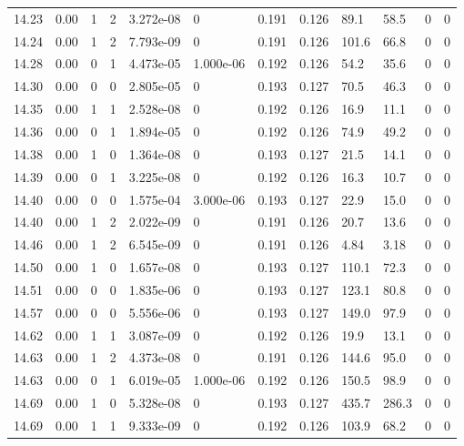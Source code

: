 \documentclass[preview]{standalone}
\begin{document}
{{{{{{{{{{{\begin{tabular}{L{1.2cm}C{1.2cm} C{0.3cm}C{0.5cm} C{1.4cm}C{1.4cm} C{1.4cm}C{1.4cm} C{1.6cm}C{1.6cm} C{1.6cm}C{1.6cm}}
  14.23  &  0.00  & 1     &  2 &  3.272e-08  & 0  &  0.191&   0.126& 89.1 & 58.5   &  0 & 0  \\ 
  14.24  &  0.00  & 1     &  2 &  7.793e-09  & 0  &  0.191&   0.126& 101.6 & 66.8   &  0 & 0  \\ 
  14.28  &  0.00  & 0     &  1 &  4.473e-05  & 1.000e-06  &  0.192&   0.126& 54.2 & 35.6   &  0 & 0  \\ 
  14.30  &  0.00  & 0     &  0 &  2.805e-05  & 0  &  0.193&   0.127& 70.5 & 46.3   &  0 & 0  \\ 
  14.35  &  0.00  & 1     &  1 &  2.528e-08  & 0  &  0.192&   0.126& 16.9 & 11.1   &  0 & 0  \\ 
  14.36  &  0.00  & 0     &  1 &  1.894e-05  & 0  &  0.192&   0.126& 74.9 & 49.2   &  0 & 0  \\ 
  14.38  &  0.00  & 1     &  0 &  1.364e-08  & 0  &  0.193&   0.127& 21.5 & 14.1   &  0 & 0  \\ 
  14.39  &  0.00  & 0     &  1 &  3.225e-08  & 0  &  0.192&   0.126& 16.3 & 10.7   &  0 & 0  \\ 
  14.40  &  0.00  & 0     &  0 &  1.575e-04  & 3.000e-06  &  0.193&   0.127& 22.9 & 15.0   &  0 & 0  \\ 
  14.40  &  0.00  & 1     &  2 &  2.022e-09  & 0  &  0.191&   0.126& 20.7 & 13.6   &  0 & 0  \\ 
  14.46  &  0.00  & 1     &  2 &  6.545e-09  & 0  &  0.191&   0.126& 4.84 & 3.18   &  0 & 0  \\ 
  14.50  &  0.00  & 1     &  0 &  1.657e-08  & 0  &  0.193&   0.127& 110.1 & 72.3   &  0 & 0  \\ 
  14.51  &  0.00  & 0     &  0 &  1.835e-06  & 0  &  0.193&   0.127& 123.1 & 80.8   &  0 & 0  \\ 
  14.57  &  0.00  & 0     &  0 &  5.556e-06  & 0  &  0.193&   0.127& 149.0 & 97.9   &  0 & 0  \\ 
  14.62  &  0.00  & 1     &  1 &  3.087e-09  & 0  &  0.192&   0.126& 19.9 & 13.1   &  0 & 0  \\ 
  14.63  &  0.00  & 1     &  2 &  4.373e-08  & 0  &  0.191&   0.126& 144.6 & 95.0   &  0 & 0  \\ 
  14.63  &  0.00  & 0     &  1 &  6.019e-05  & 1.000e-06  &  0.192&   0.126& 150.5 & 98.9   &  0 & 0  \\ 
  14.69  &  0.00  & 1     &  0 &  5.328e-08  & 0  &  0.193&   0.127& 435.7 & 286.3   &  0 & 0  \\ 
  14.69  &  0.00  & 1     &  1 &  9.333e-09  & 0  &  0.192&   0.126& 103.9 & 68.2   &  0 & 0  \\ 

\end{tabular}}}}}}}}}}}}
\end{document}
